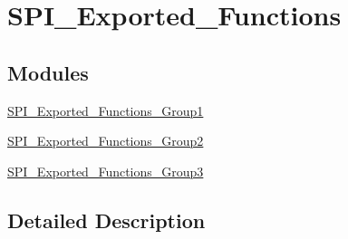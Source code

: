 \hypertarget{group___s_p_i___exported___functions}{}\section{S\+P\+I\+\_\+\+Exported\+\_\+\+Functions}
\label{group___s_p_i___exported___functions}
\subsection*{Modules}
\begin{DoxyCompactItemize}
\item 
\mbox{\hyperlink{group___s_p_i___exported___functions___group1}{S\+P\+I\+\_\+\+Exported\+\_\+\+Functions\+\_\+\+Group1}}
\item 
\mbox{\hyperlink{group___s_p_i___exported___functions___group2}{S\+P\+I\+\_\+\+Exported\+\_\+\+Functions\+\_\+\+Group2}}
\item 
\mbox{\hyperlink{group___s_p_i___exported___functions___group3}{S\+P\+I\+\_\+\+Exported\+\_\+\+Functions\+\_\+\+Group3}}
\end{DoxyCompactItemize}


\subsection{Detailed Description}
